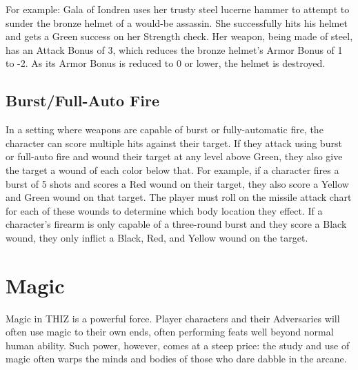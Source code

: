 \documentclass[oneside]{book}
\begin{document}
\begin{multicols}{2}
For example: Gala of Iondren uses her trusty steel lucerne hammer to attempt to sunder the bronze helmet of a would-be assassin. She successfully hits his helmet and gets a Green success on her Strength check. Her weapon, being made of steel, has an Attack Bonus of 3, which reduces the bronze helmet's Armor Bonus of 1 to -2. As its Armor Bonus is reduced to 0 or lower, the helmet is destroyed. 

\section{Burst/Full-Auto Fire}
In a setting where weapons are capable of burst or fully-automatic fire, the character can score multiple hits against their target. If they attack using burst or full-auto fire and wound their target at any level above Green, they also give the target a wound of each color below that. For example, if a character fires a burst of 5 shots and scores a Red wound on their target, they also score a Yellow and Green wound on that target. The player must roll on the missile attack chart for each of these wounds to determine which body location they effect. If a character's firearm is only capable of a three-round burst and they score a Black wound, they only inflict a Black, Red, and Yellow wound on the target. 

\end{multicols}

\chapter{Magic}
Magic in THIZ is a powerful force. Player characters and their Adversaries will often use magic to their own ends, often performing feats well beyond normal human ability. Such power, however, comes at a steep price: the study and use of magic often warps the minds and bodies of those who dare dabble in the arcane.
\end{document}
